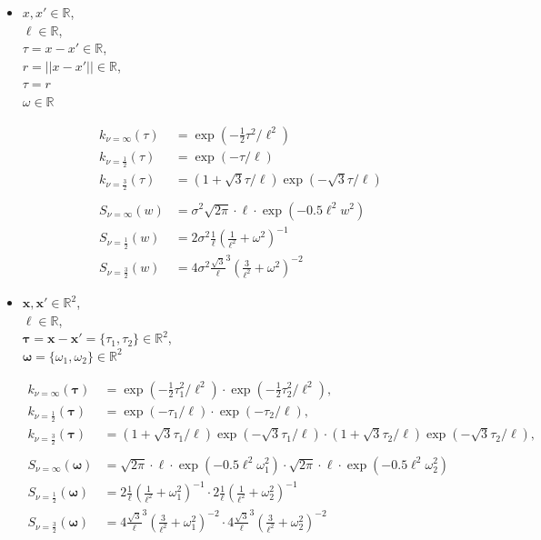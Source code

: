 \documentclass[]{interact}
\theoremstyle{plain}%
\theoremstyle{definition}
\theoremstyle{remark}
\begin{document}
\begin{itemize}
\item 
$x, x' \in \mathbb{R}$,\\
$\ell \in \mathbb{R}$, \\
$\tau=x-x'\in \mathbb{R}$, \\
$r=||x-x'||\in \mathbb{R}$, \\
$\tau=r$ \\
$\omega\in \mathbb{R}$

%
\begin{align*}
k_{\nu=\infty}(\tau)&=\exp(-\frac{1}{2} \tau^2/\ell^2) \\
k_{\nu=\frac{1}{2}}(\tau)&=\exp(-\tau/\ell) \\
k_{\nu=\frac{3}{2}}(\tau)&=(1+\sqrt{3}\tau/\ell) \exp(-\sqrt{3}\tau/\ell)  \\
\\
S_{\nu=\infty}(w)&= \sigma^2 \sqrt{2\pi} \cdot \ell \cdot \exp\left(-0.5 \ell^2 w^2\right) \\
S_{\nu=\frac{1}{2}}(w)&= 2\sigma^2 \frac{1}{\ell}\left(\frac{1}{\ell^2} + \omega^2\right)^{-1} \\
S_{\nu=\frac{3}{2}}(w)&= 4\sigma^2 \frac{\sqrt{3}}{\ell}^{3}\left(\frac{3}{\ell^2} + \omega^2\right)^{-2}
\end{align*}


\item 
$\mathbf{x}, \mathbf{x}' \in \mathbb{R}^2$, \\
$\ell \in \mathbb{R}$, \\
$\bm{\tau}=\mathbf{x}- \mathbf{x}'=\{\tau_1,\tau_2 \}\in \mathbb{R}^2$, \\
$\bm{\omega}=\{\omega_1,\omega_2 \}\in \mathbb{R}^2$

%
\begin{align*}
k_{\nu=\infty}(\bm{\tau})&=\exp(-\frac{1}{2} \tau_1^2/\ell^2) \cdot \exp(-\frac{1}{2} \tau_2^2/\ell^2), \\
k_{\nu=\frac{1}{2}}(\bm{\tau})&=\exp(-\tau_1/\ell) \cdot \exp(-\tau_2/\ell), \\
k_{\nu=\frac{3}{2}}(\bm{\tau})&=(1+\sqrt{3}\tau_1/\ell) \exp(-\sqrt{3}\tau_1/\ell) \cdot (1+\sqrt{3}\tau_2/\ell) \exp(-\sqrt{3}\tau_2/\ell),  \\
\\
S_{\nu=\infty}(\bm{\omega})&= \sqrt{2\pi} \cdot \ell \cdot \exp\left(-0.5 \ell^2 \omega_1^2\right) \cdot  \sqrt{2\pi} \cdot \ell \cdot \exp\left(-0.5 \ell^2 \omega_2^2\right) \\
S_{\nu=\frac{1}{2}}(\bm{\omega})&= 2 \frac{1}{\ell}\left(\frac{1}{\ell^2} + \omega_1^2\right)^{-1} \cdot 2 \frac{1}{\ell}\left(\frac{1}{\ell^2} + \omega_2^2\right)^{-1} \\
S_{\nu=\frac{3}{2}}(\bm{\omega})&= 4 \frac{\sqrt{3}}{\ell}^{3}\left(\frac{3}{\ell^2} + \omega_1^2\right)^{-2} \cdot 4 \frac{\sqrt{3}}{\ell}^{3}\left(\frac{3}{\ell^2} + \omega_2^2\right)^{-2}
\end{align*}



\end{itemize}
\end{document}
